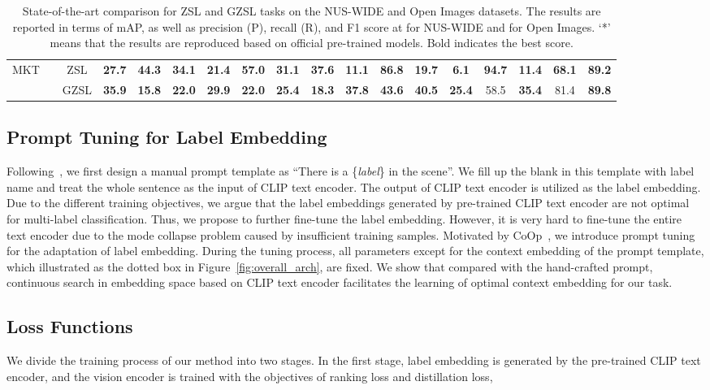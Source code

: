 \documentclass[letterpaper]{article} \usepackage{aaai23}  \usepackage{times}  \usepackage{helvet}  \usepackage{courier}  \usepackage[hyphens]{url}  \usepackage{graphicx} \urlstyle{rm} \def\UrlFont{\rm}  \usepackage{natbib}  \usepackage{caption} \frenchspacing  \setlength{\pdfpagewidth}{8.5in}  \setlength{\pdfpageheight}{11in}
\begin{document}
\begin{table*}[t]
{\begin{tabular}{c|c|cccccccc|cccccccc}
\multirow{2}{*}{MKT} 
 &  & ZSL   & \textbf{27.7}  & \textbf{44.3}  & \textbf{34.1}  & \textbf{21.4}  & \textbf{57.0}  & \textbf{31.1}  & \textbf{37.6}  
        & \textbf{11.1}  & \textbf{86.8}  & \textbf{19.7}  & \textbf{6.1}   & \textbf{94.7}  & \textbf{11.4}  & \textbf{68.1}   & \textbf{89.2} \\
 &  & GZSL  & \textbf{35.9}  & \textbf{15.8}  & \textbf{22.0}  & \textbf{29.9}  & \textbf{22.0}  & \textbf{25.4}  & \textbf{18.3}   
        & \textbf{37.8}  & \textbf{43.6}  & \textbf{40.5}  & \textbf{25.4}  & 58.5  & \textbf{35.4}  & 81.4   & \textbf{89.8} \\ 
\cmidrule(lr){3-18}
\bottomrule[0.1em]
\end{tabular}
}
\caption{
State-of-the-art comparison for ZSL and GZSL tasks on the NUS-WIDE and Open Images datasets. 
The results are reported in terms of mAP, as well as precision (P), recall (R), and F1 score at  for NUS-WIDE and  for Open Images.
`*' means that the results are reproduced based on official pre-trained models.
Bold indicates the best score.}
\label{tab:sota}
\end{table*} 
\subsection{Prompt Tuning for Label Embedding}
Following~\cite{clip}, we first design a manual prompt template as ``There is a \{\textit{label}\} in the scene''. 
We fill up the blank in this template with label name and treat the whole sentence as the input of CLIP text encoder.
The output of CLIP text encoder is utilized as the label embedding.
Due to the different training objectives, we argue that the label embeddings generated by pre-trained CLIP text encoder are not optimal for multi-label classification.
Thus, we propose to further fine-tune the label embedding.
However, it is very hard to fine-tune the entire text encoder due to the mode collapse problem caused by insufficient training samples.
Motivated by CoOp~\cite{coop}, we introduce prompt tuning for the adaptation of label embedding.
During the tuning process, all parameters except for the context embedding of the prompt template, which illustrated as the dotted box in Figure~\ref{fig:overall_arch}, are fixed.
We show that compared with the hand-crafted prompt, continuous search in embedding space based on CLIP text encoder facilitates the learning of optimal context embedding for our task.

\subsection{Loss Functions}
We divide the training process of our method into two stages. 
In the first stage, label embedding is generated by the pre-trained CLIP text encoder, and the vision encoder is trained with the objectives of ranking loss and distillation loss,
\end{document}
